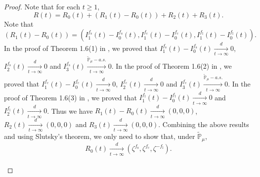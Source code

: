 \documentclass[12pt,a4paper]{amsart}
\theoremstyle{plain}
\newtheorem{lem}[thm]{Lemma}
\theoremstyle{definition}
\numberwithin{equation}{section}
\begin{document}
\begin{proof}

Note that for each $t\geq 1$,
\[
R(t)=R_0(t)+(R_1(t)-R_0(t))+R_2(t)+R_3(t).
\]
Note that
$$
(R_1(t)-R_0(t))=(I_1^{f_\mathrm s}(t)-I_0^{f_\mathrm s}(t), I_1^{f_\mathrm c}(t)-I_0^{f_\mathrm c}(t), I_1^{f_\mathrm l}(t)-I_0^{f_\mathrm l}(t)).
$$
In the proof of Theorem 1.6(1) in \cite{RenSongSunZhao2019Stable}, we proved that 
$I_1^{f_\mathrm s}(t)-I_0^{f_\mathrm s}(t)\xrightarrow[t\to \infty]{d} 0$, $I_2^{f_\mathrm s}(t)\xrightarrow[t\to \infty]{d} 0$ and $I_3^{f_\mathrm s}(t)\xrightarrow[t\to \infty]{\mathbb{\widetilde{P}}_{\mu}-a.s.} 0.$
 In the proof of Theorem 1.6(2) in \cite{RenSongSunZhao2019Stable}, we proved that 
 $I_1^{f_\mathrm c}(t)-I_0^{f_\mathrm c}(t)\xrightarrow[t\to \infty]{d} 0$, $I_2^{f_\mathrm c}(t)\xrightarrow[t\to \infty]{d} 0$ and $I_3^{f_\mathrm c}(t)\xrightarrow[t\to \infty]{\mathbb{\widetilde{P}}_{\mu}-a.s.} 0.$ 
In the proof of Theorem 1.6(3) in \cite{RenSongSunZhao2019Stable}, we proved that 
$I_1^{f_\mathrm l}(t)-I_0^{f_\mathrm l}(t)\xrightarrow[t\to \infty]{d} 0$ and  $I_2^{f_\mathrm l}(t)\xrightarrow[t\to \infty]{d} 0$.
Thus we have %
$R_1(t)-R_0(t)\xrightarrow[t\to \infty]{d} (0,0,0)$, $R_2(t)\xrightarrow[t\to \infty]{d}(0,0,0)$ and
$R_3(t)\xrightarrow[t\to \infty]{d}(0,0,0)$. 
Combining the above results and using Slutsky's theorem, we only need to  show that, under $\mathbb{\widetilde{P}}_{\mu}$, 
\begin{equation}
\label{lem:UOT}R_0(t) \xrightarrow[t\to \infty]{d}(\zeta^{f_\mathrm s},\zeta^{f_\mathrm c},\zeta^{-f_\mathrm l}).
\end{equation} 
%
%
\\

\end{proof}
\end{document}
